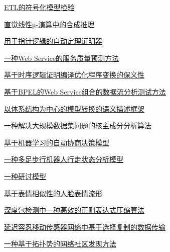 \documentclass[a4paper]{article}
\begin{document}
\href{http://www.jos.org.cn/ch/reader/download_pdf.aspx?file_no=3449&year_id=2009&quarter_id=8&falg=1}{ETL的符号化模型检验}

\href{http://www.jos.org.cn/ch/reader/download_pdf.aspx?file_no=569&year_id=2009&quarter_id=8&falg=1}{直觉线性μ-演算中的合成推理}

\href{http://www.jos.org.cn/ch/reader/download_pdf.aspx?file_no=572&year_id=2009&quarter_id=8&falg=1}{用于指针逻辑的自动定理证明器}

\href{http://www.jos.org.cn/ch/reader/download_pdf.aspx?file_no=3375&year_id=2009&quarter_id=8&falg=1}{一种Web Service的服务质量预测方法}

\href{http://www.jos.org.cn/ch/reader/download_pdf.aspx?file_no=3378&year_id=2009&quarter_id=8&falg=1}{基于时序逻辑证明编译优化程序变换的保义性}

\href{http://www.jos.org.cn/ch/reader/download_pdf.aspx?file_no=568&year_id=2009&quarter_id=8&falg=1}{基于BPEL的Web Service组合的数据流分析测试方法}

\href{http://www.jos.org.cn/ch/reader/download_pdf.aspx?file_no=573&year_id=2009&quarter_id=8&falg=1}{以体系结构为中心的模型转换的语义描述框架}

\href{http://www.jos.org.cn/ch/reader/download_pdf.aspx?file_no=3391&year_id=2009&quarter_id=8&falg=1}{一种解决大规模数据集问题的核主成分分析算法}

\href{http://www.jos.org.cn/ch/reader/download_pdf.aspx?file_no=3362&year_id=2009&quarter_id=8&falg=1}{基于机器学习的自动协商决策模型}

\href{http://www.jos.org.cn/ch/reader/download_pdf.aspx?file_no=3364&year_id=2009&quarter_id=8&falg=1}{一种多足步行机器人行走状态分析模型}

\href{http://www.jos.org.cn/ch/reader/download_pdf.aspx?file_no=3465&year_id=2009&quarter_id=8&falg=1}{一种研讨模型}

\href{http://www.jos.org.cn/ch/reader/download_pdf.aspx?file_no=3374&year_id=2009&quarter_id=8&falg=1}{基于表情相似性的人脸表情流形}

\href{http://www.jos.org.cn/ch/reader/download_pdf.aspx?file_no=3311&year_id=2009&quarter_id=8&falg=1}{深度包检测中一种高效的正则表达式压缩算法}

\href{http://www.jos.org.cn/ch/reader/download_pdf.aspx?file_no=3323&year_id=2009&quarter_id=8&falg=1}{延迟容忍移动传感器网络中基于选择复制的数据传输}

\href{http://www.jos.org.cn/ch/reader/download_pdf.aspx?file_no=3318&year_id=2009&quarter_id=8&falg=1}{一种基于拓扑势的网络社区发现方法}
\end{document}
